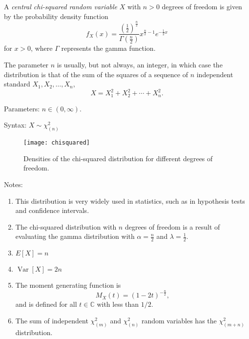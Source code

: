 \documentclass{article}
\def\Var{\operatorname{Var}}
\begin{document}

A \emph{central chi-squared random variable} $X$ with $n>0$ degrees of freedom is given by the probability density function
\[
  f_X(x) = \frac{ (\frac{1}{2})^{\frac{n}{2}} } {\Gamma(\frac{n}{2})}
           x^{\frac{n}{2} - 1} e^{- \frac{1}{2} x} 
\]
for $x > 0$, where $\Gamma$ represents the gamma function.

The parameter $n$ is usually, but not always, an integer, in which case the distribution is that of the sum of the squares of a sequence of $n$ independent standard  $X_1,X_2,\ldots,X_n$,
\begin{equation*}
X=X_1^2+X_2^2+\cdots+X_n^2.
\end{equation*}

Parameters: $n\in(0,\infty)$.

Syntax: $X\sim \chi_{(n)}^{2}$

\begin{figure}[h]
\centering
\texttt{[image: chisquared]}
\caption{Densities of the chi-squared distribution for different degrees of freedom.}
\end{figure}

Notes:

\begin{enumerate}

\item This distribution is very widely used in statistics, such as in hypothesis tests and confidence intervals.
\item The chi-squared distribution with $n$ degrees of freedom is a result of evaluating the gamma distribution with $\alpha = \frac{n}{2}$ and $\lambda = \frac{1}{2}$.
\item $E[X] = n$
\item $\Var[X] = 2n$
\item The moment generating function is
\begin{equation*}
M_X(t) = \left(1 - 2t\right)^{-\frac{n}{2}},
\end{equation*}
and is defined for all $t\in\mathbb{C}$ with  less than $1/2$.
\item The sum of independent $\chi_{(m)}^2$ and $\chi_{(n)}^2$ random variables has the $\chi_{(m+n)}^2$ distribution.
\end{enumerate}
\end{document}
